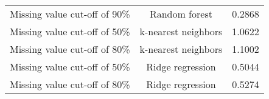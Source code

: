 \documentclass{article}\usepackage[]{graphicx}\usepackage[]{color}
\begin{document}
\begin{table}[ht]
\begin{tabular}{@{}|l|c|c|@{}}
Missing value cut-off of 90\% & Random forest & 0.2868 \\
                                                                                                                                                                                                                                                                                                                                                                                                                                                                                                                                                                                                Missing value cut-off of 50\% & k-nearest neighbors & 1.0622 \\ 
                                                                                                                                                                                                                                                                                                                                                                                                                                                                                                                                                                                                Missing value cut-off of 80\% & k-nearest neighbors & 1.1002 \\ 
                                                                                                                                                                                                                                                                                                                                                                                                                                                                                                                                                                                                Missing value cut-off of 50\% & Ridge regression & 0.5044 \\
                                                                                                                                                                                                                                                                                                                                                                                                                                                                                                                                                                                                Missing value cut-off of 80\% & Ridge regression & 0.5274 \\


\end{tabular}
\end{table}
\end{document}
